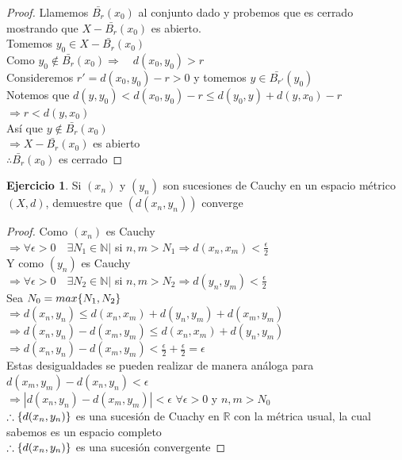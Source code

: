 \documentclass[11pt,a4paper,oneside]{report}
\theoremstyle{definition}
\newtheorem{ejercicio}[definicion]{Ejercicio}
\theoremstyle{plain}
\theoremstyle{remark}
\newcommand{\N}{\mathbb{N}}
\newcommand{\R}{\mathbb{R}}
\DeclarePairedDelimiter{\conj}{\{}{\}}
\begin{document}
\begin{proof}
  Llamemos $\bar{B_r}(x_0)$ al conjunto dado y probemos que es cerrado mostrando que 
  $X-\bar{B_r}(x_0)$ es abierto.\\
  Tomemos $y_0 \in X- \bar{B_r}(x_0)$\\
  Como $y_0 \not \in \bar{B_r}(x_0)\Rightarrow \quad d(x_0,y_0)>r$\\
  Consideremos $r'=d(x_0,y_0) - r>0$ y tomemos $y\in \bar{B_{r'}}(y_0)$\\
  Notemos que $d(y,y_0)<d(x_0,y_0)-r\leq d(y_0,y)+d(y,x_0)-r$\\
  $\Rightarrow r < d(y,x_0)$\\
  Así que $y\not \in \bar{B_r}(x_0)$\\
  $\Rightarrow X-\bar{B_r}(x_0)$ es abierto\\
  $\therefore \bar{B_r}(x_0)$ es cerrado
\end{proof}

\begin{ejercicio}
  Si $(x_n)$ y $(y_n)$ son sucesiones de Cauchy en un espacio métrico $(X,d)$, 
  demuestre que $(d(x_n,y_n))$ converge
\end{ejercicio}

\begin{proof}
Como $(x_n)$ es Cauchy \\
$\Rightarrow \forall \epsilon>0 \quad \exists N_1\in \N |$ si $n,m>N_1\Rightarrow d(x_n,x_m)<\frac{\epsilon}{2}$\\
Y como $(y_n)$ es Cauchy \\
$\Rightarrow \forall \epsilon>0 \quad \exists N_2\in \N |$ si $n,m>N_2\Rightarrow d(y_n,y_m)<\frac{\epsilon}{2}$\\
Sea $N_0=max\conj{N_1,N_2}$\\
$\Rightarrow d(x_n,y_n)\leq d(x_n, x_m) + d(y_n, y_m)+ d(x_m,y_m)$\\
$\Rightarrow d(x_n,y_n)-d(x_m,y_m)\leq d(x_n, x_m) + d(y_n, y_m)$\\
$\Rightarrow d(x_n,y_n)-d(x_m,y_m) < \frac{\epsilon}{2}+\frac{\epsilon}{2}=\epsilon$\\
Estas desigualdades se pueden realizar de manera análoga para $d(x_m,y_m)-d(x_n,y_n) < \epsilon $\\
$\Rightarrow |d(x_n,y_n)-d(x_m,y_m)| < \epsilon $ $\forall \epsilon>0 $ y $n,m>N_0$\\
$\therefore \conj{d(x_n,y_n)}$ es una sucesión de Cuachy en $\R$ con la métrica usual, la cual sabemos es un espacio
completo\\
$\therefore \conj{d(x_n,y_n)}$ es una sucesión convergente
\end{proof}
\end{document}
